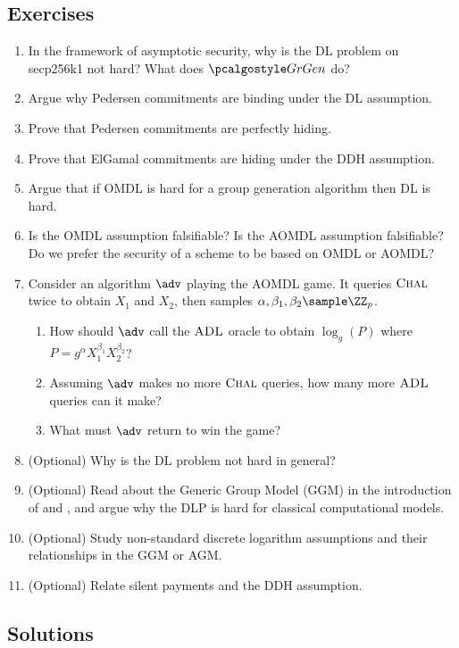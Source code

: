 \subsection{Exercises}

\begin{enumerate}
  \item In the framework of asymptotic security, why is the DL problem on secp256k1 not hard? What does $\grgen$ do?
  \item Argue why Pedersen commitments are binding under the DL assumption.
  \item Prove that Pedersen commitments are perfectly hiding.
  \item Prove that ElGamal commitments are hiding under the DDH assumption.
  \item Argue that if OMDL is hard for a group generation algorithm then DL is hard.
  \item Is the OMDL assumption falsifiable? Is the AOMDL assumption falsifiable? Do we prefer the security of a scheme to be based on OMDL or AOMDL?
  \item Consider an algorithm $\adv$ playing the AOMDL game. It queries ${\normalfont\textsc{Chal}}$ twice to obtain $X_1$ and $X_2$, then samples $\alpha, \beta_1, \beta_2 \sample \ZZ_p$. 
        \begin{enumerate}
          \item How should $\adv$ call the ${\normalfont\textsc{ADL}}$ oracle to obtain $\log_g(P)$ where $P = g^\alpha X_1^{\beta_1} X_2^{\beta_2}$?
          \item Assuming $\adv$ makes no more ${\normalfont\textsc{Chal}}$ queries, how many more ${\normalfont\textsc{ADL}}$ queries can it make?
          \item What must $\adv$ return to win the game?
        \end{enumerate}
  \item (Optional) Why is the DL problem not hard in general?
  \item (Optional) Read about the Generic Group Model (GGM) in the introduction of \textcite{Shoup97} and \textcite{Maurer05}, and argue why the DLP is hard for classical computational models.
  \item (Optional) Study non-standard discrete logarithm assumptions and their relationships in the GGM or AGM.
  \item (Optional) Relate silent payments and the DDH assumption.
\end{enumerate}

\subsection{Solutions}


